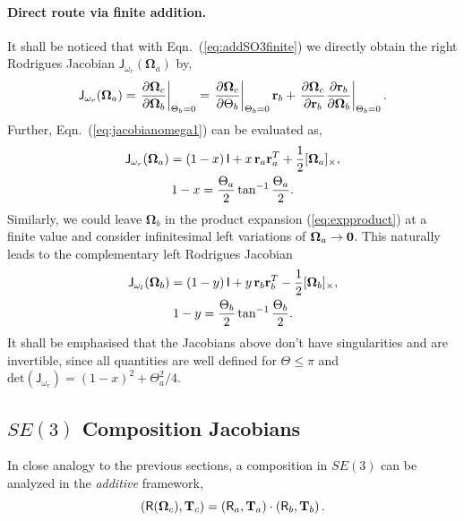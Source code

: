 \documentclass[journal]{IEEEtran}
\newcommand{\bfOmega}{\boldsymbol{\Omega}}
\newcommand{\beq}{\begin{equation}}
\newcommand{\eeq}{\end{equation}}
\begin{document}
\paragraph{Direct route via finite addition.}
It shall be noticed that with Eqn.~(\ref{eq:addSO3finite})
we directly obtain the right Rodrigues Jacobian $\mathsf{J}_{\omega_r}(\bfOmega_a)$ by,
\beq
    \mathsf{J}_{\omega_r}(\bfOmega_a) = 
    \left.{\partial \bfOmega_c \over \partial \bfOmega_b}\right|_{\Theta_b=0}=
    \left.{\partial \bfOmega_c \over \partial \Theta_b}\right|_{\Theta_b=0} {\bf r}_b+
    \left.{\partial \bfOmega_c \over \partial {\bf r}_b} {\partial {\bf r}_b \over \partial \bfOmega_b}
    \right|_{\Theta_b=0}. \label{eq:jacobianomega1}
\eeq
Further, Eqn.~(\ref{eq:jacobianomega1}) can be evaluated as,
\begin{multline}
    \mathsf{J}_{\omega_r}(\bfOmega_a) = (1-x)\, \mathsf{I}+ x\, {\bf r}_a{\bf r}_a^T + {1\over 2}[\bfOmega_a]_\times,\\
    1-x = {\Theta_a\over 2}\tan^{-1}{\Theta_a\over 2}.
    \label{eq:RodweinormanJ}
\end{multline}
Similarly, we could leave $\bfOmega_b$ in the product expansion (\ref{eq:expproduct}) at a finite value
and consider infinitesimal left variations of $\bfOmega_a\rightarrow {\bf 0}$. This naturally leads to the
complementary left Rodrigues Jacobian
\begin{multline}
    \mathsf{J}_{\omega_l} (\bfOmega_b) = (1-y)\, \mathsf{I}+ y\, {\bf r}_b{\bf r}_b^T - {1\over 2}[\bfOmega_b]_\times,\\
    1-y = {\Theta_b\over 2}\tan^{-1}{\Theta_b\over 2}.
\end{multline}
It shall be emphasised that the Jacobians above don't have singularities and are invertible, since all quantities
are well defined for $\Theta\leq\pi$ and $\mathrm{det}( \mathsf{J}_{\omega_r}) = (1-x)^2 + \Theta_a^2/4$.

\subsection{$SE(3)$ Composition Jacobians}
\label{app:SE3composition}
In close analogy to the previous sections, a composition in $SE(3)$ can be analyzed
in the {\em additive} framework,
\beq
    (\mathsf{R}(\bfOmega_c),{\bf T}_c)=(\mathsf{R}_a,{\bf T}_a)\cdot
    (\mathsf{R}_b,{\bf T}_b)\, .
\eeq
\end{document}
